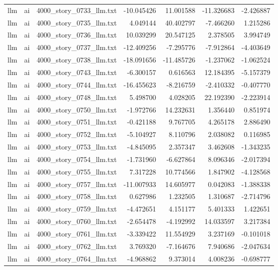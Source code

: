 \begin{longtable}{lllrrrr}
llm & ai & 4000\_story\_0733\_llm.txt & -10.045426 & 11.001588 & -11.326683 & -2.426887 \\
llm & ai & 4000\_story\_0735\_llm.txt & 4.049144 & 40.402797 & -7.466260 & 1.215286 \\
llm & ai & 4000\_story\_0736\_llm.txt & 10.039299 & 20.547125 & 2.378505 & 3.994749 \\
llm & ai & 4000\_story\_0737\_llm.txt & -12.409256 & -7.295776 & -7.912864 & -4.403649 \\
llm & ai & 4000\_story\_0738\_llm.txt & -18.091656 & -11.485726 & -1.237062 & -1.062524 \\
llm & ai & 4000\_story\_0743\_llm.txt & -6.300157 & 0.616563 & 12.184395 & -5.157379 \\
llm & ai & 4000\_story\_0744\_llm.txt & -16.455623 & -8.216759 & -2.410332 & -0.407770 \\
llm & ai & 4000\_story\_0748\_llm.txt & 5.498700 & 4.028205 & 22.192390 & -2.223914 \\
llm & ai & 4000\_story\_0750\_llm.txt & -1.972766 & 14.232631 & 1.356440 & 0.851974 \\
llm & ai & 4000\_story\_0751\_llm.txt & -0.421188 & 9.767705 & 4.265178 & 2.886490 \\
llm & ai & 4000\_story\_0752\_llm.txt & -5.104927 & 8.110796 & 2.038082 & 0.116985 \\
llm & ai & 4000\_story\_0753\_llm.txt & -4.845095 & 2.357347 & 3.462608 & -1.343235 \\
llm & ai & 4000\_story\_0754\_llm.txt & -1.731960 & -6.627864 & 8.096346 & -2.017394 \\
llm & ai & 4000\_story\_0755\_llm.txt & 7.317228 & 10.774566 & 1.847902 & -4.128568 \\
llm & ai & 4000\_story\_0757\_llm.txt & -11.007933 & 14.605977 & 0.042083 & -1.388338 \\
llm & ai & 4000\_story\_0758\_llm.txt & 0.627986 & 1.232505 & 1.310687 & -2.714796 \\
llm & ai & 4000\_story\_0759\_llm.txt & -4.472651 & 4.151177 & 5.401333 & 1.422651 \\
llm & ai & 4000\_story\_0760\_llm.txt & -2.654478 & -4.192992 & 14.033597 & 3.217384 \\
llm & ai & 4000\_story\_0761\_llm.txt & -3.339422 & 11.554929 & 3.237169 & -0.101018 \\
llm & ai & 4000\_story\_0762\_llm.txt & 3.769320 & -7.164676 & 7.940686 & -2.047634 \\
llm & ai & 4000\_story\_0764\_llm.txt & -4.968862 & 9.373014 & 4.008236 & -0.698777 \\

\end{longtable}
